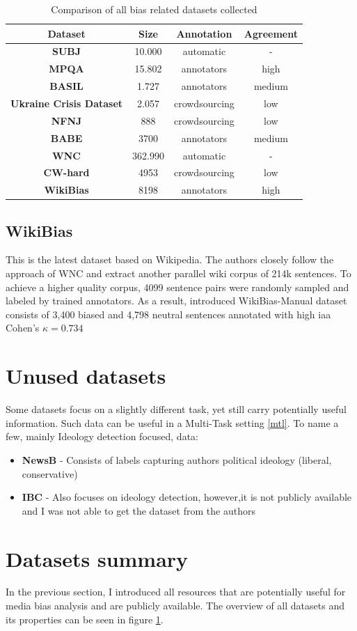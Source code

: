 \begin{table}
\begin{ctucolortab}
\begin{tabular}{c|c|c|c}
 \textbf{Dataset} & \textbf{Size} & \textbf{Annotation} & \textbf{Agreement}\\
 \hline
 \textbf{SUBJ} & 10.000 & automatic & -\\ 
 \hline
 \textbf{MPQA} & 15.802 & annotators & high \\
 \hline
 \textbf{BASIL} &  1.727 & annotators & medium \\ 
 \hline
 \textbf{Ukraine Crisis Dataset} & 2.057 & crowdsourcing & low \\ 
 \hline
 \textbf{NFNJ} & 888 & crowdsourcing & low \\
 \hline
 \textbf{BABE} & 3700 & annotators & medium \\
 \hline 
 \textbf{WNC} & 362.990 & automatic & - \\
 \hline
 \textbf{CW-hard} & 4953 & crowdsourcing & low \\
 \hline 
 \textbf{WikiBias} & 8198 & annotators & high \\
 \hline
\end{tabular}
\end{ctucolortab}
\caption{Comparison of all bias related datasets collected}
\label{table:1}
\end{table}


\subsection{WikiBias}
This is the latest dataset based on Wikipedia. The authors closely follow the approach of WNC \cite{pryzant2020automatically} and extract another parallel wiki corpus of 214k sentences.
To achieve a higher quality corpus, 4099 sentence pairs were randomly sampled and labeled by trained annotators. As a result, introduced WikiBias-Manual dataset consists of 3,400 biased and 4,798 neutral sentences annotated with high \gls{iaa} Cohen's $\kappa = 0.734$




\section{Unused datasets}
 Some datasets focus on a slightly different task, yet still carry potentially useful information. Such data can be useful in a Multi-Task setting \ref{mtl}. To name a few, mainly Ideology detection focused, data:
\begin{itemize}
\item \textbf{NewsB} - 
Consists of labels capturing authors political ideology (liberal, conservative)
\item \textbf{IBC} - Also focuses on ideology detection, however,it is not publicly available and I was not able to get the dataset from the authors
\end{itemize}


\section{Datasets summary}
In the previous section, I introduced all resources that are potentially useful for media bias analysis and are publicly available. The overview of all datasets and its properties can be seen in figure \ref{table:1}.
